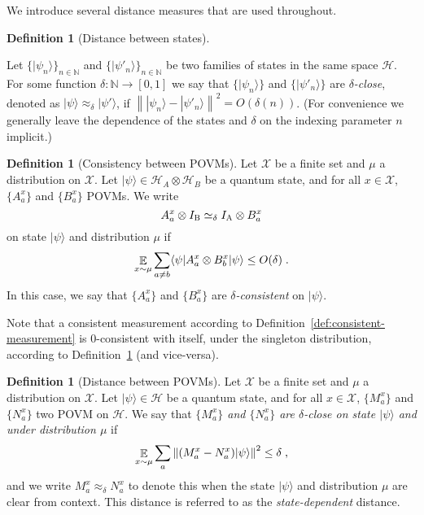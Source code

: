 \documentclass[11pt]{article}
\theoremstyle{definition}
\newtheorem{definition}[theorem]{Definition}
\newcommand{\ket}[1]{|#1\rangle}
\newcommand{\bra}[1]{\langle#1|}
\newcommand{\N}{\ensuremath{\mathbb{N}}}
\newcommand{\mH}{\ensuremath{\mathcal{H}}}
\newcommand{\mX}{\ensuremath{\mathcal{X}}}
\newcommand{\norm}[1]{\left\| {#1} \right\|}
\newcommand{\E}{\mathop{\mathbb{E}}\displaylimits} %
\newcommand{\labelstyle}[1]{\ensuremath{\textsc{#1}}\xspace}
\newcommand{\alice}{\labelstyle{A}}
\newcommand{\bob}{\labelstyle{B}}
\renewcommand{\cal}[1]{\mathcal{#1}}
\begin{document}
We introduce several distance measures that are used throughout.

\begin{definition}[Distance between states]
  \label{def:state-distance}

	Let $\{\ket{\psi_n}\}_{n\in \N}$ and $\{\ket{\psi'_n}\}_{n\in \N}$ be two
  families of states in the same space $\mH$.
  For some function $\delta : \N \to [0,1]$ we say that $\{ \ket{\psi_n} \}$ and
  $\{ \ket{\psi'_n} \}$ are \emph{$\delta$-close}, denoted as $\ket{\psi}
  \approx_\delta \ket{\psi'}$, if $ \norm{\ket{\psi_n} - \ket{\psi'_n}}^2 =
  O(\delta(n))$.
  (For convenience we generally leave the dependence of the states and $\delta$
  on the indexing parameter $n$ implicit.)
\end{definition}

\begin{definition}[Consistency between POVMs]
  \label{def:consistency}
	Let $\mX$ be a finite set and $\mu$ a distribution on $\mX$.
  Let $\ket{\psi} \in \cal{H}_A \otimes \cal{H}_B$ be a quantum state, and for
  all $x\in \mX$, $\{A^x_a\}$ and $\{B^x_a\}$ POVMs.
  We write
  \begin{equation*}
    A^x_a \otimes I_\bob \simeq_\delta I_\alice \otimes B^x_a
  \end{equation*}
  on state $\ket{\psi}$ and distribution $\mu$ if
  \begin{equation*}
    \E_{x\sim \mu} \sum_{a\ne b} \bra{\psi} A^x_a \otimes B^x_b \ket{\psi}
    \leq O(\delta)\;.
  \end{equation*}
  In this case, we say that $\{A^x_a\}$ and $\{B^x_a\}$ are
  \emph{$\delta$-consistent} on $\ket{\psi}$.
\end{definition}

Note that a consistent measurement according to
Definition~\ref{def:consistent-measurement} is $0$-consistent with itself, under
the singleton distribution, according to Definition~\ref{def:consistency} (and
vice-versa).

\begin{definition}[Distance between POVMs]
  \label{def:povm-distance}
	Let $\mX$ be a finite set and $\mu$ a distribution on $\mX$. 
  Let $\ket{\psi} \in \cal{H}$ be a quantum state, and for all $x\in \mX$,
  $\{M^x_a\}$ and $\{N^x_a\}$ two POVM on $\mH$.
  We say that \emph{$\{M^x_a\}$ and $\{N^x_a\}$ are $\delta$-close on state
    $\ket{\psi}$ and under distribution $\mu$} if
  \begin{equation*}
    \E_{x\sim \mu} \sum_a \norm{ (M^x_a - N^x_a) \ket{\psi} }^2 \leq \delta\;,
  \end{equation*}
  and we write $M^x_a \approx_\delta N^x_a$ to denote this when the state
  $\ket{\psi}$ and distribution $\mu$ are clear from context.
  This distance is referred to as the \emph{state-dependent} distance.
\end{definition}
\end{document}
